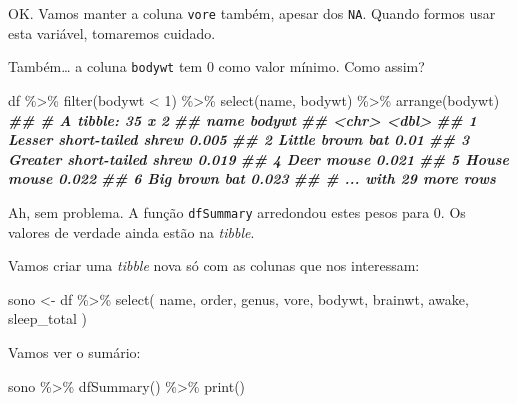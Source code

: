 \documentclass[
  12pt]{report}
\newenvironment{Shaded}{\begin{snugshade}}{\end{snugshade}}
\newcommand{\DecValTok}[1]{\textcolor[rgb]{0.00,0.00,0.81}{#1}}
\newcommand{\DocumentationTok}[1]{\textcolor[rgb]{0.56,0.35,0.01}{\textbf{\textit{#1}}}}
\newcommand{\FunctionTok}[1]{\textcolor[rgb]{0.00,0.00,0.00}{#1}}
\newcommand{\NormalTok}[1]{#1}
\newcommand{\OtherTok}[1]{\textcolor[rgb]{0.56,0.35,0.01}{#1}}
\newcommand{\SpecialCharTok}[1]{\textcolor[rgb]{0.00,0.00,0.00}{#1}}
\begin{document}
OK. Vamos manter a coluna \texttt{vore} também, apesar dos \texttt{NA}. Quando formos usar esta variável, tomaremos cuidado.

Também\ldots{} a coluna \texttt{bodywt} tem 0 como valor mínimo. Como assim?

\begin{Shaded}
\begin{Highlighting}[]
\NormalTok{df }\SpecialCharTok{\%\textgreater{}\%} 
  \FunctionTok{filter}\NormalTok{(bodywt }\SpecialCharTok{\textless{}} \DecValTok{1}\NormalTok{) }\SpecialCharTok{\%\textgreater{}\%} 
  \FunctionTok{select}\NormalTok{(name, bodywt) }\SpecialCharTok{\%\textgreater{}\%} 
  \FunctionTok{arrange}\NormalTok{(bodywt)}
\DocumentationTok{\#\# \# A tibble: 35 x 2}
\DocumentationTok{\#\#   name                       bodywt}
\DocumentationTok{\#\#   \textless{}chr\textgreater{}                       \textless{}dbl\textgreater{}}
\DocumentationTok{\#\# 1 Lesser short{-}tailed shrew   0.005}
\DocumentationTok{\#\# 2 Little brown bat            0.01 }
\DocumentationTok{\#\# 3 Greater short{-}tailed shrew  0.019}
\DocumentationTok{\#\# 4 Deer mouse                  0.021}
\DocumentationTok{\#\# 5 House mouse                 0.022}
\DocumentationTok{\#\# 6 Big brown bat               0.023}
\DocumentationTok{\#\# \# ... with 29 more rows}
\end{Highlighting}
\end{Shaded}

Ah, sem problema. A função \texttt{dfSummary} arredondou estes pesos para 0. Os valores de verdade ainda estão na \emph{tibble}.

Vamos criar uma \emph{tibble} nova só com as colunas que nos interessam:

\begin{Shaded}
\begin{Highlighting}[]
\NormalTok{sono }\OtherTok{\textless{}{-}}\NormalTok{ df }\SpecialCharTok{\%\textgreater{}\%} 
  \FunctionTok{select}\NormalTok{(}
\NormalTok{    name, order, genus, vore, bodywt, }
\NormalTok{    brainwt, awake, sleep\_total}
\NormalTok{  )}
\end{Highlighting}
\end{Shaded}

Vamos ver o sumário:

\begin{Shaded}
\begin{Highlighting}[]
\NormalTok{sono }\SpecialCharTok{\%\textgreater{}\%} \FunctionTok{dfSummary}\NormalTok{() }\SpecialCharTok{\%\textgreater{}\%} \FunctionTok{print}\NormalTok{()}
\end{Highlighting}
\end{Shaded}
\end{document}
